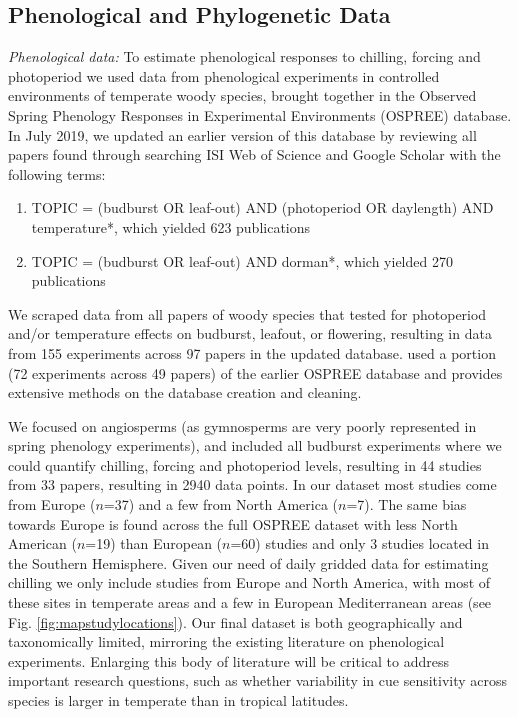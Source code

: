 \documentclass[11pt]{article}
\begin{document}
\subsection*{Phenological and Phylogenetic Data}
\emph{Phenological data:} To estimate phenological responses to chilling, forcing and photoperiod we used data from phenological experiments in controlled environments of temperate woody species, brought together in the Observed Spring Phenology Responses in Experimental Environments (OSPREE) database. In July 2019, we updated an earlier version of this database \citep{wolkovich2019} by reviewing all papers found through searching ISI Web of Science and Google Scholar with the following terms: 
\begin{enumerate}
\item TOPIC = (budburst OR leaf-out) AND (photoperiod OR daylength) AND temperature*, which yielded 623 publications
\item TOPIC = (budburst OR leaf-out) AND dorman*, which yielded 270 publications
\end{enumerate}
We scraped data from all papers of woody species that tested for photoperiod and/or temperature effects on budburst, leafout, or flowering, resulting in data from 155 experiments across 97 papers in the updated database. \citet{ettinger2020} used a portion (72 experiments across 49 papers) of the earlier OSPREE database and provides extensive methods on the database creation and cleaning.

We focused on angiosperms (as gymnosperms are very poorly represented in spring phenology experiments), and included all budburst experiments where we could quantify chilling, forcing and photoperiod levels, resulting in 44 studies from 33 papers, resulting in 2940 data points. 
In our dataset most studies come from Europe ($n$=37) and a few from North America ($n$=7). The same bias towards Europe is found across the full OSPREE dataset with less North American ($n$=19) than European ($n$=60) studies and only 3 studies located in the Southern Hemisphere. Given our need of daily gridded data for estimating chilling we only include studies from Europe and North America, with most of these sites in temperate areas and a few in European Mediterranean areas (see Fig. \ref{fig:mapstudylocations}). Our final dataset is both geographically and taxonomically limited, mirroring the existing literature on phenological experiments. Enlarging this body of literature will be critical to address important research questions, such as whether variability in cue sensitivity across species is larger in temperate than in tropical latitudes. %
\end{document}
